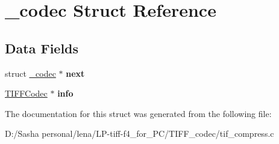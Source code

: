 \hypertarget{struct__codec}{}\section{\+\_\+codec Struct Reference}
\label{struct__codec}
\subsection*{Data Fields}
\begin{DoxyCompactItemize}
\item 
\hypertarget{struct__codec_a5e42f1c9b1cb5dc29a11b1ebdb2e0fa3}{}struct \hyperlink{struct__codec}{\+\_\+codec} $\ast$ {\bfseries next}\label{struct__codec_a5e42f1c9b1cb5dc29a11b1ebdb2e0fa3}

\item 
\hypertarget{struct__codec_ae117766bc5d5e30132da5642b767baf5}{}\hyperlink{struct_t_i_f_f_codec}{T\+I\+F\+F\+Codec} $\ast$ {\bfseries info}\label{struct__codec_ae117766bc5d5e30132da5642b767baf5}

\end{DoxyCompactItemize}


The documentation for this struct was generated from the following file\+:\begin{DoxyCompactItemize}
\item 
D\+:/\+Sasha personal/lena/\+L\+P-\/tiff-\/f4\+\_\+for\+\_\+\+P\+C/\+T\+I\+F\+F\+\_\+codec/tif\+\_\+compress.\+c\end{DoxyCompactItemize}
